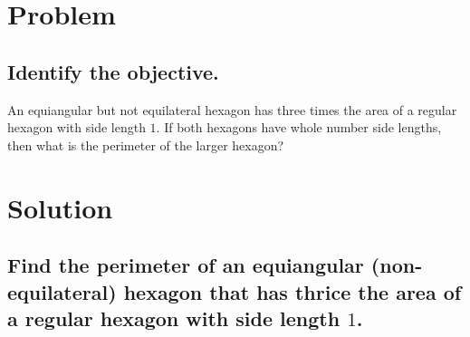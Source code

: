 \documentclass{beamer} %
\begin{document}
\begin{frame} %
  \titlepage
\end{frame}

\section{Problem}

\subsection*{Identify the objective.}

\begin{frame}
  An equiangular but not equilateral hexagon has three times the area of a regular hexagon with side length $1$. If both hexagons have whole number side lengths, then what is the perimeter of the larger hexagon?
\end{frame}

\section{Solution}

\subsection*{Find the perimeter of an equiangular (non-equilateral) hexagon that has thrice the area of a regular hexagon with side length \texorpdfstring{$1$}{1}.}
\end{document}
